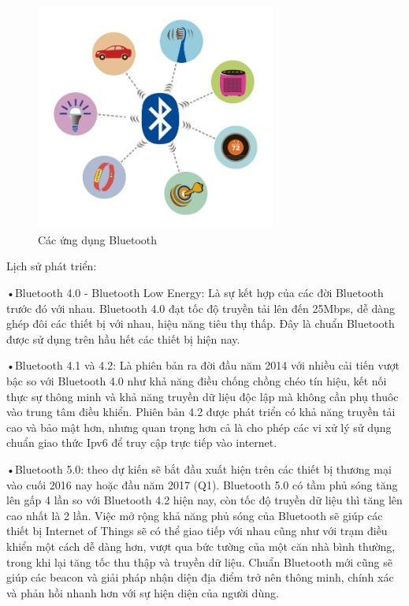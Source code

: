 \begin{figure}[ht]
	\centering    
	\includegraphics[width=0.7\textwidth]{btuse}
	\caption[Các ứng dụng Bluetooth]{Các ứng dụng Bluetooth}
	\label{fig:btuse}
\end{figure}

Lịch sử phát triển:

•Bluetooth 4.0 - Bluetooth Low Energy: Là sự kết hợp của các đời Bluetooth trước đó với nhau. Bluetooth 4.0 đạt tốc độ truyền tải lên đến 25Mbps, dễ dàng ghép đôi các thiết bị với nhau, hiệu năng tiêu thụ thấp. Đây là chuẩn Bluetooth được sử dụng trên hầu hết các thiết bị hiện nay.

•Bluetooth 4.1 và 4.2: Là phiên bản ra đời đầu năm 2014 với nhiều cải tiến vượt bậc so với Bluetooth 4.0 như khả năng điều chống chồng chéo tín hiệu, kết nối thực sự thông minh và khả năng truyền dữ liệu độc lập mà không cần phụ thuôc vào trung tâm điều khiển. Phiên bản 4.2 được phát triển có khả năng truyền tải cao và bảo mật hơn, nhưng quan trọng hơn cả là cho phép các vi xử lý sử dụng chuẩn giao thức Ipv6 để truy cập trực tiếp vào internet.

•Bluetooth 5.0: theo dự kiến sẽ bắt đầu xuất hiện trên các thiết bị thương mại vào cuối 2016 nay hoặc đầu năm 2017 (Q1). Bluetooth 5.0 có tầm phủ sóng tăng lên gấp 4 lần so với Bluetooth 4.2 hiện nay, còn tốc độ truyền dữ liệu thì tăng lên cao nhất là 2 lần. Việc mở rộng khả năng phủ sóng của Bluetooth sẽ giúp các thiết bị Internet of Things sẽ có thể giao tiếp với nhau cũng như với trạm điều khiển một cách dễ dàng hơn, vượt qua bức tường của một căn nhà bình thường, trong khi lại tăng tốc thu thập và truyền dữ liệu. Chuẩn Bluetooth mới cũng sẽ giúp các beacon và giải pháp nhận diện địa điểm trở nên thông minh, chính xác và phản hồi nhanh hơn với sự hiện diện của người dùng.

